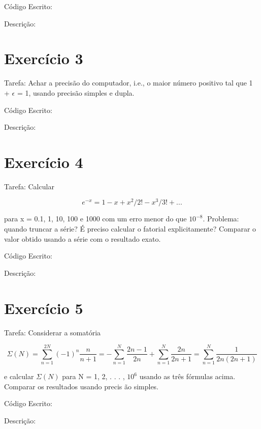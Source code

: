 \documentclass[12pt, a4paper]{article} %
\begin{document}
C\'odigo Escrito:


Descri\c{c}\~ao:

\section{Exerc\'icio 3}

Tarefa: Achar a precis\~ao  do computador, i.e., o maior n\'umero positivo  tal que
1 + $\epsilon$ = 1, usando precis\~ao simples e dupla.

C\'odigo Escrito:


Descri\c{c}\~ao:

\section{Exerc\'icio 4}

Tarefa: Calcular

\begin{equation} e^{-x} = 1 - x + x^2/2! - x^3/3! + ... \end{equation}

para x = 0.1, 1, 10, 100 e 1000 com um erro menor do que $10^{-8}$. Problema:
quando truncar a s\'erie? \'E preciso calcular o fatorial explicitamente? Comparar o valor obtido usando a s\'erie com o resultado exato.

C\'odigo Escrito:


Descri\c{c}\~ao:

\section{Exerc\'icio 5}

Tarefa: Considerar a somat\'oria

\begin{equation} \Sigma (N) = \sum_{n=1}^{2N} (-1)^n\frac{n}{n+1} = - \sum_{n=1}^N \frac{2n-1}{2n} + \sum_{n=1}^N \frac{2n}{2n+1} = \sum_{n=1}^N \frac{1}{2n(2n+1)} \end{equation}

e calcular $\Sigma (N)$ para N = 1, 2, . . . , $10^6$ usando as tr\^es f\'ormulas acima. Comparar os resultados usando precis \~ao simples.

C\'odigo Escrito:


Descri\c{c}\~ao:
\end{document}
